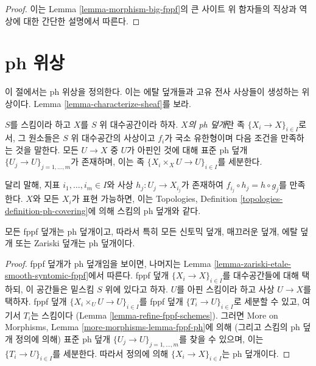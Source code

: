 \begin{proof}
이는 Lemma \ref{lemma-morphism-big-fppf}의 큰 사이트 위 함자들의 직상과
역상에 대한 간단한 설명에서 따른다.
\end{proof}








\section{ph 위상}
\label{section-ph}

\noindent
이 절에서는 ph 위상을 정의한다. 이는 에탈 덮개들과 고유 전사 사상들이
생성하는 위상이다. Lemma \ref{lemma-characterize-sheaf}를 보라.

\begin{definition}
\label{definition-ph-covering}
$S$를 스킴이라 하고 $X$를 $S$ 위 대수공간이라 하자. {\it $X$의 ph
덮개}란 족 $\{X_i \to X\}_{i \in I}$로서, 그 원소들은 $S$ 위
대수공간의 사상이고 $f_i$가 국소 유한형이며 다음 조건을 만족하는 것을
말한다. 모든 $U \to X$ 중 $U$가 아핀인 것에 대해 표준 ph 덮개
$\{U_j \to U\}_{j = 1, \ldots, m}$가 존재하며, 이는 족
$\{X_i \times_X U \to U\}_{i \in I}$를 세분한다.
\end{definition}

\noindent
달리 말해, 지표 $i_1, \ldots, i_m \in I$와 사상
$h_j : U_j \to X_{i_j}$가 존재하여
$f_{i_j} \circ h_j = h \circ g_j$를 만족한다.
$X$와 모든 $X_i$가 표현 가능하면, 이는 Topologies, Definition
\ref{topologies-definition-ph-covering}에 의해 스킴의 ph 덮개와 같다.

\begin{lemma}
\label{lemma-zariski-etale-smooth-syntomic-fppf-ph}
모든 fppf 덮개는 ph 덮개이고, 따라서 특히 모든 신토믹 덮개, 매끄러운
덮개, 에탈 덮개 또는 Zariski 덮개는 ph 덮개이다.
\end{lemma}

\begin{proof}
fppf 덮개가 ph 덮개임을 보이면, 나머지는 Lemma
\ref{lemma-zariski-etale-smooth-syntomic-fppf}에서 따른다. fppf 덮개
$\{X_i \to X\}_{i \in I}$를 대수공간들에 대해 택하되, 이 공간들은
밑스킴 $S$ 위에 있다고 하자. $U$를 아핀 스킴이라 하고 사상
$U \to X$를 택하자. fppf 덮개
$\{X_i \times_U U \to U\}_{i \in I}$를 fppf 덮개
$\{T_i \to U\}_{i \in I}$로 세분할 수 있고, 여기서 $T_i$는 스킴이다
(Lemma \ref{lemma-refine-fppf-schemes}).
그러면 More on Morphisms, Lemma \ref{more-morphisms-lemma-fppf-ph}에 의해
(그리고 스킴의 ph 덮개 정의에 의해) 표준 ph 덮개
$\{U_j \to U\}_{j = 1, \ldots, m}$를 찾을 수 있으며, 이는
$\{T_i \to U\}_{i \in I}$를 세분한다.
따라서 정의에 의해 $\{X_i \to X\}_{i \in I}$는 ph 덮개이다.
\end{proof}

